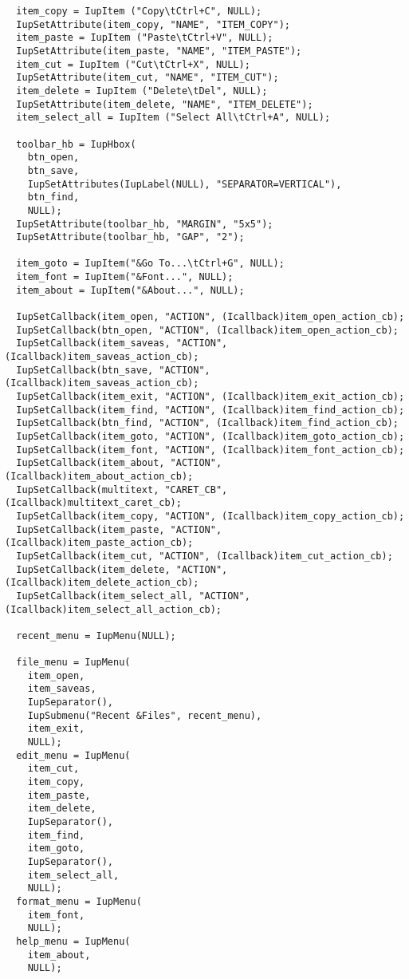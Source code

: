\documentclass{ctexart}
\begin{document}
\begin{lstlisting}
  item_copy = IupItem ("Copy\tCtrl+C", NULL);
  IupSetAttribute(item_copy, "NAME", "ITEM_COPY");  
  item_paste = IupItem ("Paste\tCtrl+V", NULL);
  IupSetAttribute(item_paste, "NAME", "ITEM_PASTE");
  item_cut = IupItem ("Cut\tCtrl+X", NULL);
  IupSetAttribute(item_cut, "NAME", "ITEM_CUT");  
  item_delete = IupItem ("Delete\tDel", NULL);
  IupSetAttribute(item_delete, "NAME", "ITEM_DELETE");  
  item_select_all = IupItem ("Select All\tCtrl+A", NULL);

  toolbar_hb = IupHbox(
    btn_open,
    btn_save,
    IupSetAttributes(IupLabel(NULL), "SEPARATOR=VERTICAL"),
    btn_find,
    NULL);
  IupSetAttribute(toolbar_hb, "MARGIN", "5x5");
  IupSetAttribute(toolbar_hb, "GAP", "2");

  item_goto = IupItem("&Go To...\tCtrl+G", NULL);
  item_font = IupItem("&Font...", NULL);
  item_about = IupItem("&About...", NULL);

  IupSetCallback(item_open, "ACTION", (Icallback)item_open_action_cb);
  IupSetCallback(btn_open, "ACTION", (Icallback)item_open_action_cb);
  IupSetCallback(item_saveas, "ACTION", (Icallback)item_saveas_action_cb);
  IupSetCallback(btn_save, "ACTION", (Icallback)item_saveas_action_cb);
  IupSetCallback(item_exit, "ACTION", (Icallback)item_exit_action_cb);
  IupSetCallback(item_find, "ACTION", (Icallback)item_find_action_cb);
  IupSetCallback(btn_find, "ACTION", (Icallback)item_find_action_cb);  
  IupSetCallback(item_goto, "ACTION", (Icallback)item_goto_action_cb);
  IupSetCallback(item_font, "ACTION", (Icallback)item_font_action_cb);
  IupSetCallback(item_about, "ACTION", (Icallback)item_about_action_cb);
  IupSetCallback(multitext, "CARET_CB", (Icallback)multitext_caret_cb);
  IupSetCallback(item_copy, "ACTION", (Icallback)item_copy_action_cb);
  IupSetCallback(item_paste, "ACTION", (Icallback)item_paste_action_cb);
  IupSetCallback(item_cut, "ACTION", (Icallback)item_cut_action_cb);
  IupSetCallback(item_delete, "ACTION", (Icallback)item_delete_action_cb);
  IupSetCallback(item_select_all, "ACTION", (Icallback)item_select_all_action_cb);

  recent_menu = IupMenu(NULL);

  file_menu = IupMenu(
    item_open,
    item_saveas,
    IupSeparator(),
    IupSubmenu("Recent &Files", recent_menu),
    item_exit,
    NULL);
  edit_menu = IupMenu(
    item_cut,
    item_copy,
    item_paste,
    item_delete,
    IupSeparator(),
    item_find,
    item_goto,
    IupSeparator(),
    item_select_all,
    NULL);
  format_menu = IupMenu(
    item_font,
    NULL);
  help_menu = IupMenu(
    item_about,
    NULL);


\end{lstlisting}
\end{document}
